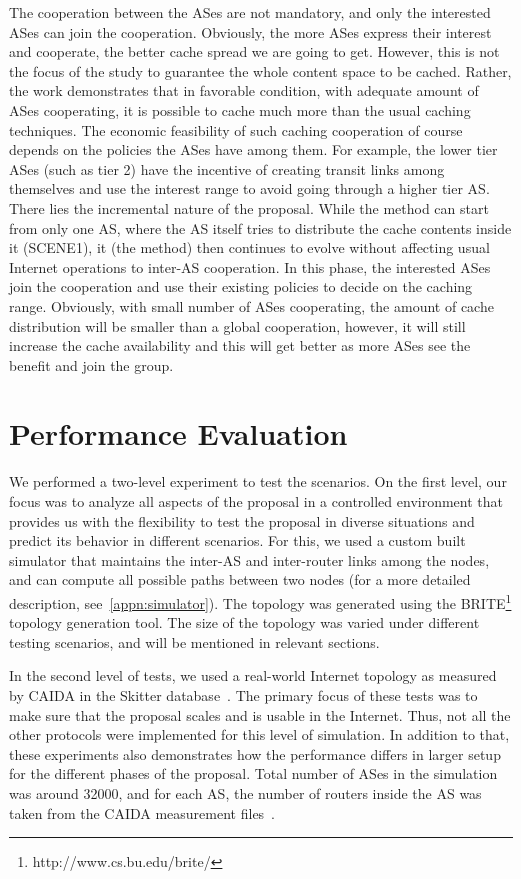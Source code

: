 \documentclass[article]{elsarticle}
\begin{document}
The cooperation between the ASes are not mandatory, and only the interested ASes can join the cooperation. Obviously, the more ASes express their interest and cooperate, the better cache spread we are going to get. However, this is not the focus of the study to guarantee the whole content space to be cached. Rather, the work demonstrates that in favorable condition, with adequate amount of ASes cooperating, it is possible to cache much more than the usual caching techniques. The economic feasibility of such caching cooperation of course depends on the policies the ASes have among them. For example, the lower tier ASes (such as tier 2) have the incentive of creating transit links among themselves and use the interest range to avoid going through a higher tier AS. There lies the incremental nature of the proposal. While the method can start from only one AS, where the AS itself tries to distribute the cache contents inside it (SCENE1), it (the method) then continues to evolve without affecting usual Internet operations to inter-AS cooperation. In this phase, the interested ASes join the cooperation and use their existing policies to decide on the caching range. Obviously, with small number of ASes cooperating, the amount of cache distribution will be smaller than a global cooperation, however, it will still increase the cache availability and this will get better as more ASes see the benefit and join the group. 

\section{Performance Evaluation}
\label{sec:perfeval}
We performed a two-level experiment to test the scenarios. On the first level, our focus was to analyze all aspects of the proposal in a controlled environment that provides us with the flexibility to test the proposal in diverse situations and predict its behavior in different scenarios. For this, we used a custom built simulator that maintains the inter-AS and inter-router links among the nodes, and can compute all possible paths between two nodes (for a more detailed description, see~\ref{appn:simulator}). The topology was generated using the BRITE\footnote{http://www.cs.bu.edu/brite/} topology generation tool. The size of the topology was varied under different testing scenarios, and will be mentioned in relevant sections.

In the second level of tests, we used a real-world Internet topology as measured by CAIDA in the Skitter database~\cite{skitter}. The primary focus of these tests was to make sure that the proposal scales and is usable in the Internet. Thus, not all the other protocols were implemented for this level of simulation. In addition to that, these experiments also demonstrates how the performance differs in larger setup for the different phases of the proposal. Total number of ASes in the simulation was around 32000, and for each AS, the number of routers inside the AS was taken from the CAIDA measurement files~\cite{skitter}.
\end{document}
